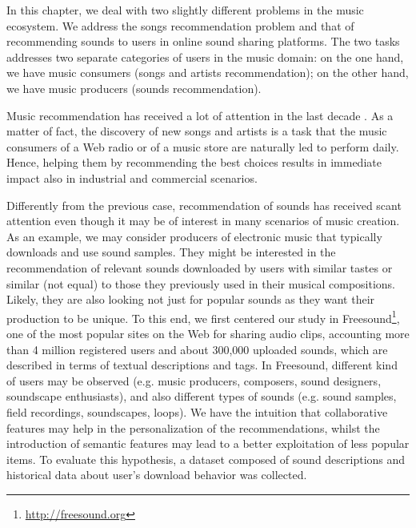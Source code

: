 In this chapter, we deal with two slightly different problems in the music ecosystem. We address the songs recommendation problem and that of recommending sounds to users in online sound sharing platforms. The two tasks addresses two separate categories of users in the music domain: on the one hand, we have music consumers (songs and artists recommendation); on the other hand, we have music producers (sounds recommendation).

Music recommendation has received a lot of attention in the last decade \cite{knees_schedl2013}. As a matter of fact, the discovery of new songs and artists is a task that the music consumers of a Web radio or of a music store are naturally led to perform daily. Hence, helping them by recommending the best choices results in immediate impact also in industrial and commercial scenarios.

Differently from the previous case, recommendation of sounds has received scant attention even though it may be of interest in many scenarios of music creation. As an example, we may consider producers of electronic music that typically downloads and use sound samples. They might be interested in the recommendation of relevant sounds downloaded by users with similar tastes or similar (not equal) to those they previously used in their musical compositions. Likely, they are also looking not just for popular sounds as they want their production to be unique.
To this end, we first centered our study in Freesound\footnote{\url{http://freesound.org}}, one of the most popular sites on the Web for sharing audio clips, accounting more than 4 million registered users and about 300,000 uploaded sounds, which are described in terms of textual descriptions and tags. In Freesound, different kind of users may be observed \cite{Font2012} (e.g. music producers, composers, sound designers, soundscape enthusiasts), and also different types of sounds (e.g. sound samples, field recordings, soundscapes, loops).
We have the intuition that collaborative features may help in the personalization of the recommendations, whilst the introduction of semantic features may lead to a better exploitation of less popular items. To evaluate this hypothesis, a dataset composed of sound descriptions and historical data about user's download behavior was collected.


